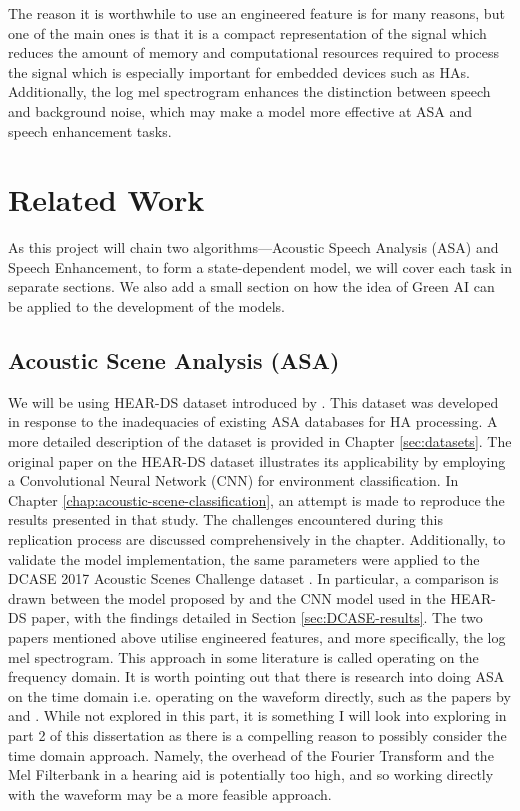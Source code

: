 \documentclass[logo,bsc,singlespacing,parskip,online]{infthesis}
\begin{document}
The reason it is worthwhile to use an engineered feature is for many reasons, but one of the main ones is that 
it is a compact representation of the signal which reduces the amount of memory and computational resources required 
to process the signal which is especially important for embedded devices such as HAs. 
Additionally, the log mel spectrogram enhances the distinction between speech and background noise, which 
may make a model more effective at ASA and speech enhancement tasks.
\section{Related Work}
As this project will chain two algorithms—Acoustic Speech Analysis (ASA) and Speech Enhancement, 
to form a state-dependent model, we will cover each task in separate sections. We also add 
a small section on how the idea of Green AI can be applied to the development of the models.

\subsection{Acoustic Scene Analysis (ASA)}
We will be using HEAR-DS dataset introduced by \citet{Huwel2020HearDS}. This dataset was developed in response to the inadequacies of existing ASA databases for HA processing. A more detailed description of the dataset is provided in Chapter \ref{sec:datasets}.
The original paper on the HEAR-DS dataset illustrates its applicability by employing a Convolutional Neural Network (CNN) for environment classification. In Chapter \ref{chap:acoustic-scene-classification}, an attempt is made to reproduce the results presented in that study. The challenges encountered during this replication process are discussed comprehensively in the chapter. Additionally, to validate the model implementation, the same parameters were applied to the DCASE 2017 Acoustic Scenes Challenge dataset \citep{DCASE2017challenge}. In particular, a comparison is drawn between the model proposed by \citet{schindler_multi-temporal_2018} and the CNN model used in the HEAR-DS paper, with the findings detailed in Section \ref{sec:DCASE-results}.
The two papers mentioned above utilise engineered features, and more specifically, the log mel spectrogram. This 
approach in some literature is called operating on the frequency domain. It is worth pointing out 
that there is research into doing ASA on the time domain i.e. operating on the waveform directly, 
such as the papers by \cite{dai_very_2016} and \cite{kumar_end_2020}. While not explored in this part, 
it is something I will look into exploring in part 2 of this dissertation as there is 
a compelling reason to possibly consider the time domain approach. Namely, 
the overhead of the Fourier Transform and the Mel Filterbank in a hearing aid 
is potentially too high, and so working directly with the waveform may be a more feasible approach.
\end{document}
